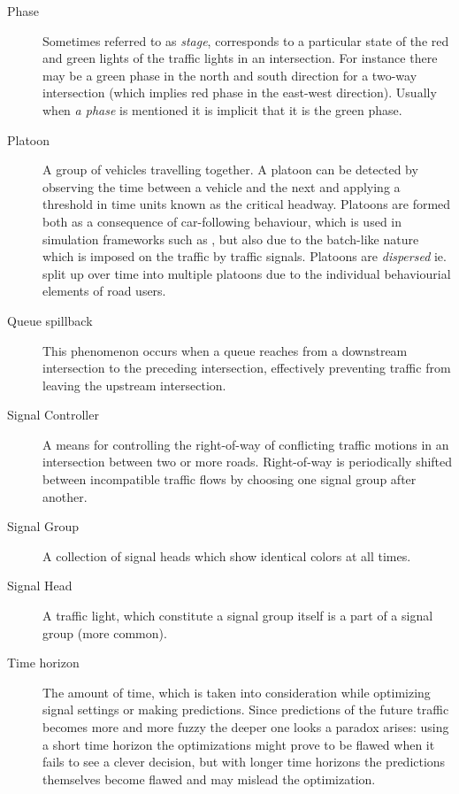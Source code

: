 \begin{description}
	\item[Phase] Sometimes referred to as \textit{stage}, corresponds to a particular state of the red and green lights of the traffic lights in an intersection.
	For instance there may be a green phase in the north and south direction for a two-way intersection (which implies red phase in the east-west direction). Usually when \textit{a phase} is mentioned it is implicit that it is the green phase.
	
	\item[Platoon] A group of vehicles travelling together. A platoon can be detected by observing the time between a vehicle and the next and applying a threshold in time units known as the critical headway.
Platoons are formed both as a consequence of car-following behaviour, which is used in simulation frameworks such as \cite{treiber-2000-62}, but also due to the batch-like nature which is imposed on the traffic by traffic signals.
Platoons are \textit{dispersed} ie. split up over time into multiple platoons due to the individual behaviourial elements of road users.

\item[Queue spillback] This phenomenon occurs when a queue reaches from a downstream intersection to the preceding intersection, effectively preventing traffic from leaving the upstream intersection.

\item[Signal Controller] A means for controlling the right-of-way of conflicting traffic motions in an intersection between two or more roads. Right-of-way is periodically shifted between incompatible traffic flows by choosing one signal group after another.

\item[Signal Group] A collection of signal heads which show identical colors at all times.

\item[Signal Head] A traffic light, which constitute a signal group itself is a part of a signal group (more common).

\item[Time horizon] The amount of time, which is taken into consideration while optimizing signal settings or making predictions. Since predictions of the future traffic becomes more and more fuzzy the deeper one looks a paradox arises: using a short time horizon the optimizations might prove to be flawed when it fails to see a clever decision, but with longer time horizons the predictions themselves become flawed and may mislead the optimization.


\end{description}
